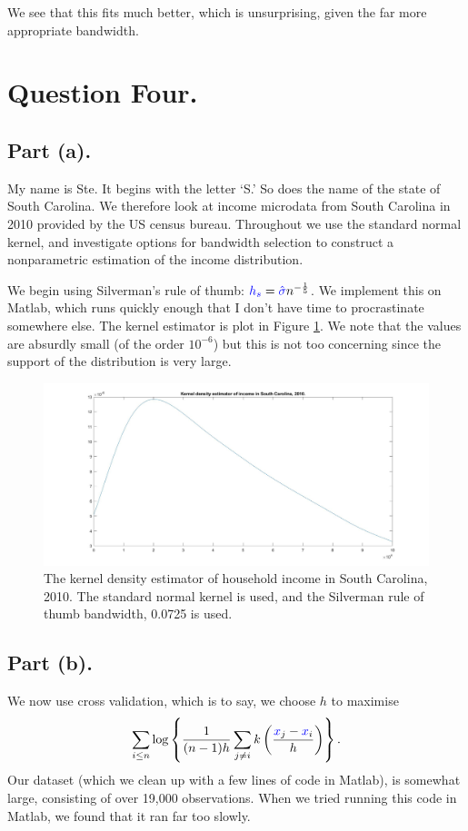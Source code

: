 \documentclass{article}
\renewcommand{\r}[1]{\textcolor{blue}{#1}}
\begin{document}
We see that this fits much better, which is unsurprising, given the far more appropriate bandwidth.

\section{Question Four.}
\subsection{Part (a).}
My name is Ste. It begins with the letter `S.' So does the name of the state of South Carolina. We therefore look at income microdata from South Carolina in 2010 provided by the US census bureau. Throughout we use the standard normal kernel, and investigate options for bandwidth selection to construct a nonparametric estimation of the income distribution. 

We begin using Silverman's rule of thumb: $\r{h_{s}}=\r{\hat{\sigma}}n^{-\frac{1}{5}}$. We implement this on Matlab, which runs quickly enough that I don't have time to procrastinate somewhere else. The kernel estimator is plot in Figure \ref{fig:q4ks}. We note that the values are absurdly small (of the order $10^{-6}$) but this is not too concerning since the support of the distribution is very large.

\begin{center}
\begin{figure}
\centering
\includegraphics[width=13cm]{q4s.jpg}
\caption{The kernel density estimator of household income in South Carolina, 2010. The standard normal kernel is used, and the Silverman rule of thumb bandwidth, 0.0725 is used.}
\label{fig:q4ks}
\end{figure} 
\end{center}


\subsection{Part (b).}
We now use cross validation, which is to say, we choose $h$ to maximise 
\begin{equation} \sum_{i\leq n} \log\left\{\frac{1}{(n-1)h}\sum_{j\neq i}k\left(\frac{\r{x}_{j}-\r{x}_{i}}{h}\right)\right\}.\end{equation}
Our dataset (which we clean up with a few lines of code in Matlab), is somewhat large, consisting of over 19,000 observations. When we tried running this code in Matlab, we found that it ran far too slowly. 
\end{document}
